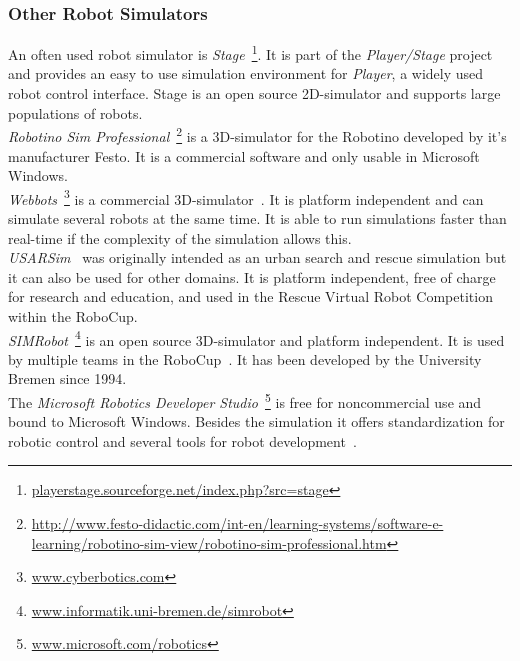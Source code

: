 \documentclass[11pt,a4paper]{article}
\begin{document}
\subsubsection{Other Robot Simulators}
An often used robot simulator is \textit{Stage}~\footnote{\url{playerstage.sourceforge.net/index.php?src=stage}}. It is part of the \textit{Player/Stage} project~\cite{PlayerStage} and provides an easy to use simulation environment for \textit{Player}, a widely used robot control interface. Stage is an open source 2D-simulator and supports large populations of robots.\\
\textit{Robotino Sim Professional}~\footnote{\url{http://www.festo-didactic.com/int-en/learning-systems/software-e-learning/robotino-sim-view/robotino-sim-professional.htm}} is a 3D-simulator for the Robotino developed by it's manufacturer Festo. It is a commercial software and only usable in Microsoft Windows.\\
\textit{Webbots}~\footnote{\url{www.cyberbotics.com}} is a commercial 3D-simulator~\cite{Webbots}. It is platform independent and can simulate several robots at the same time. It is able to run simulations faster than real-time if the complexity of the simulation allows this.\\
\textit{USARSim}~\cite{USARSim} was originally intended as an urban search and rescue simulation but it can also be used for other domains. It is platform independent, free of charge for research and education, and used in the Rescue Virtual Robot Competition within the RoboCup.\\
\textit{SIMRobot}~\footnote{\url{www.informatik.uni-bremen.de/simrobot}} is an open source 3D-simulator and platform independent. It is used by multiple teams in the RoboCup~\cite{SIMRobot}. It has been developed by the University Bremen since 1994.\\
The \textit{Microsoft Robotics Developer Studio}~\footnote{\url{www.microsoft.com/robotics}} is free for noncommercial use and bound to Microsoft Windows. Besides the simulation it offers standardization for robotic control and several tools for robot development~\cite{MicrosoftRoboticsStudio}.
\end{document}
